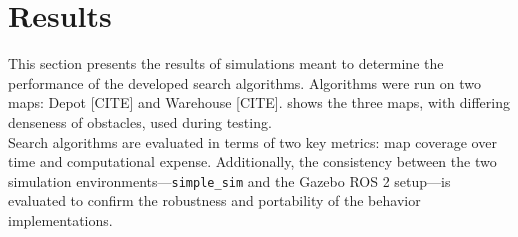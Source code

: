 
\section{Results}
\label{sec:results}
This section presents the results of simulations meant to determine the performance of the developed search algorithms. Algorithms were run on two maps: Depot {\color{red} [CITE]} and Warehouse {\color{red} [CITE]}.  shows the three maps, with differing denseness of obstacles, used during testing. \\

Search algorithms are evaluated in terms of two key metrics: map coverage over time and computational expense. Additionally, the consistency between the two simulation environments—\texttt{simple\_sim} and the Gazebo ROS 2 setup—is evaluated to confirm the robustness and portability of the behavior implementations.

